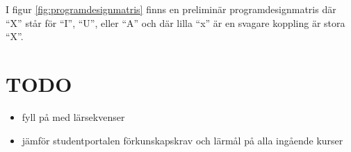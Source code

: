 \documentclass[twocolumn]{article}
\begin{document}
I figur \ref{fig:programdesignmatris} finns en preliminär
programdesignmatris där ``X'' står för ``I'', ``U'', eller ``A'' och
där lilla ``x'' är en svagare koppling är stora ``X''.

\appendix

% 
\section{TODO}
\begin{itemize}
\item fyll på med lärsekvenser
\item jämför studentportalen förkunskapskrav och lärmål på alla ingående kurser
\end{itemize}

\end{document}
